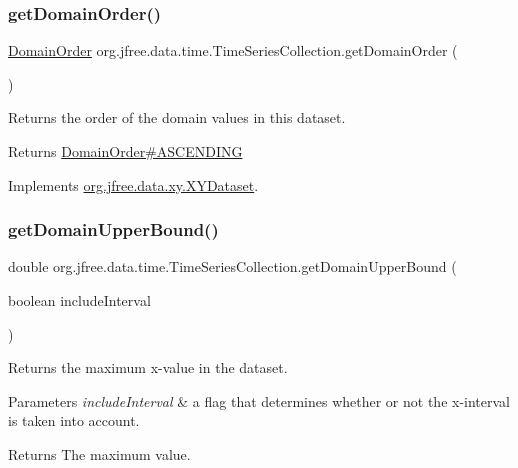 \subsubsection{\texorpdfstring{get\+Domain\+Order()}{getDomainOrder()}}
{\footnotesize\ttfamily \mbox{\hyperlink{classorg_1_1jfree_1_1data_1_1_domain_order}{Domain\+Order}} org.\+jfree.\+data.\+time.\+Time\+Series\+Collection.\+get\+Domain\+Order (\begin{DoxyParamCaption}{ }\end{DoxyParamCaption})}

Returns the order of the domain values in this dataset.

\begin{DoxyReturn}{Returns}
\mbox{\hyperlink{classorg_1_1jfree_1_1data_1_1_domain_order_a6ae95cc575e12e1a68d624ac02ba1aaf}{Domain\+Order\#\+A\+S\+C\+E\+N\+D\+I\+NG}} 
\end{DoxyReturn}


Implements \mbox{\hyperlink{interfaceorg_1_1jfree_1_1data_1_1xy_1_1_x_y_dataset_a49306db52a1ea7de951d807d21ab9c7c}{org.\+jfree.\+data.\+xy.\+X\+Y\+Dataset}}.

\mbox{\label{classorg_1_1jfree_1_1data_1_1time_1_1_time_series_collection_ac3a9f4f6c020c7797a7788a412d34463}} 
\subsubsection{\texorpdfstring{get\+Domain\+Upper\+Bound()}{getDomainUpperBound()}}
{\footnotesize\ttfamily double org.\+jfree.\+data.\+time.\+Time\+Series\+Collection.\+get\+Domain\+Upper\+Bound (\begin{DoxyParamCaption}\item[{boolean}]{include\+Interval }\end{DoxyParamCaption})}

Returns the maximum x-\/value in the dataset.


\begin{DoxyParams}{Parameters}
{\em include\+Interval} & a flag that determines whether or not the x-\/interval is taken into account.\\
\hline
\end{DoxyParams}
\begin{DoxyReturn}{Returns}
The maximum value. 
\end{DoxyReturn}


